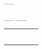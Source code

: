 \documentclass[11pt,a4paper]{article}
\begin{document}

\begin{table}[!ht]
  \centering
  \begin{minipage}{0.08\textwidth}
    \centering

\vfillFirst

\_\_


\vfillLast

  \end{minipage}
  \hfillx
  \begin{minipage}{0.37\textwidth}
    \centering

\begin{center}

\_\_  \_\_


\medskip


\begin{tabular}{|C{0.75cm} | C{0.75cm}|C{0.75cm}|C{0.75cm}|C{0.75cm}|}
\hline
{}  &   &  &  &  \\
  &   &  &  &  \\
\hline
{}  &  & & & \\
  &  & & & \\ \hline
{}  &  & & & \\
  &  & & & \\ \hline
\end{tabular}
\end{center}

  \end{minipage}
  \hfillx
  \begin{minipage}{0.55\textwidth}
    \centering

\vfillFirst

\phantom{42}


\vfillLast

  \end{minipage}
\end{table}
\end{document}

